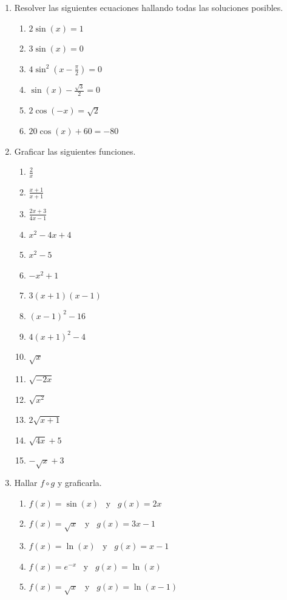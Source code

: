 \documentclass[a4paper]{article}
\newcommand{\exercise}{\item}
\begin{document}
\begin{enumerate}
	\exercise Resolver las siguientes ecuaciones hallando todas las soluciones posibles.
	\begin{multicols}{3}
	\begin{enumerate} [label=(\alph*)]
		\item $2\sin(x)=1$
		\item $3\sin(x)=0$
		\item $4\sin^{2}\left(x-\frac{\pi}{2}\right)=0$
		\item $\sin(x)-\frac{\sqrt{3}}{2}=0$
		\item $2\cos(-x)=\sqrt{2}$
		\item $20\cos(x)+60=-80$
	\end{enumerate}
	\end{multicols}
	\exercise Graficar las siguientes funciones.
	\begin{multicols}{3}
	\begin{enumerate} [label=(\alph*)]
		\item $\displaystyle\frac{2}{x}$
		\item $\displaystyle\frac{x+1}{x+1}$
		\item $\displaystyle\frac{2x+3}{4x-1}$
		\item $x^2-4x+4$
		\item $x^2-5$
		\item $-x^2+1$
		\item $3(x+1)(x-1)$
		\item $(x-1)^2-16$
		\item $4(x+1)^2-4$
		\item $\sqrt{x}$
		\item $\sqrt{-2x}$
		\item $\sqrt{x^2}$
		\item $2\sqrt{x+1}$
		\item $\sqrt{4x}+5$
		\item $-\sqrt{x}+3$
	\end{enumerate}
	\end{multicols}
	\exercise Hallar $f \circ g$ y graficarla.
	\begin{enumerate} [label=(\alph*)]
		\item $f(x)=\sin(x)$ ~y~ $g(x)=2x$
		\item $f(x)=\sqrt{x}$ ~y~ $g(x)=3x-1$
		\item $f(x)=\ln(x)$ ~y~ $g(x)=x-1$
		\item $f(x)=\displaystyle{e^{-x}}$ ~y~ $g(x)=\ln(x)$
		\item $f(x)=\sqrt{x}$ ~y~ $g(x)=\ln(x-1)$

\end{enumerate}
\end{enumerate}
\end{document}
